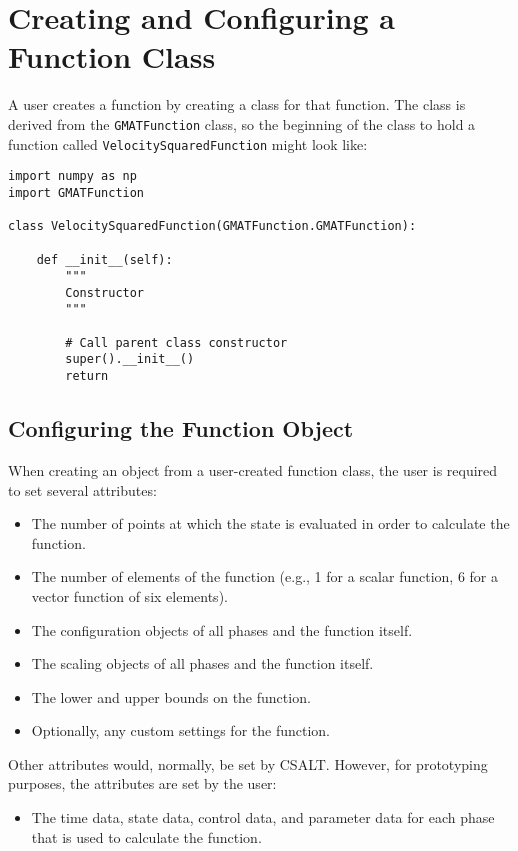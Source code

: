 \documentclass[]{article}
\begin{document}
\section{Creating and Configuring a Function Class}

A user creates a function by creating a class for that function. The class is derived from the \texttt{GMATFunction} class, so the beginning of the class to hold a function called \texttt{VelocitySquaredFunction} might look like:

\begin{verbatim}
import numpy as np    
import GMATFunction

class VelocitySquaredFunction(GMATFunction.GMATFunction):

    def __init__(self):
        """
        Constructor
        """

        # Call parent class constructor
        super().__init__()
        return
\end{verbatim}

\subsection{Configuring the Function Object}

When creating an object from a user-created function class, the user is required to set several attributes:

\begin{itemize}
	\item The number of points at which the state is evaluated in order to calculate the function.
	\item The number of elements of the function (e.g., 1 for a scalar function, 6 for a vector function of six elements).
	\item The configuration objects of all phases and the function itself.
	\item The scaling objects of all phases and the function itself.
	\item The lower and upper bounds on the function.
	\item Optionally, any custom settings for the function.
\end{itemize}

Other attributes would, normally, be set by CSALT. However, for prototyping purposes, the attributes are set by the user:

\begin{itemize}
	\item The time data, state data, control data, and parameter data for each phase that is used to calculate the function.
\end{itemize}
\end{document}

